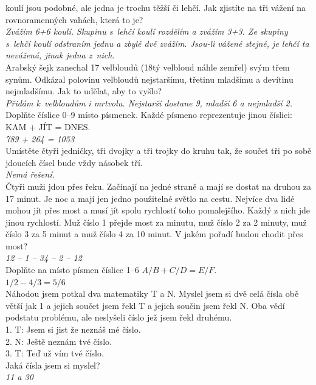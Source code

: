 \begin{multicols}{2}
 koulí jsou podobné, ale jedna je trochu těžší či lehčí. 
Jak zjistíte na tři vážení na rovnoramenných vahách, která to
je?\\[1 mm]
{\sl Zvážím 6+6 koulí. Skupinu s~lehčí koulí rozdělím a 
zvážím 3+3. Ze skupiny s~lehčí koulí odstraním jednu a 
zbylé dvě zvážím. Jsou-li vážené stejné, je lehčí ta nevážená, 
jinak jedna z~nich.}\\

\noindent
Arabský šejk zanechal 17 velbloudů (18tý velbloud náhle zemřel) 
svým třem synům. Odkázal polovinu velbloudů nejstaršímu, třetinu 
mladšímu a devítinu nejmladšímu. Jak to udělat, aby to vyšlo?\\[1 mm]
{\sl Přidám k~velbloudům i mrtvolu. Nejstarší dostane 9, 
mladší 6 a nejmladší 2.}\\

\noindent
Doplňte číslice 0--9 místo písmenek. Každé písmeno reprezentuje 
jinou číslici: KAM + JÍT = DNES.\\[1 mm]
{\sl 789 + 264 = 1053}\\

\noindent
Umístěte čtyři jedničky, tři dvojky a tři trojky do kruhu 
tak, že součet tři po sobě jdoucích čísel bude vždy násobek
tří.\\[1 mm]
{\sl Nemá řešení.}\\

\noindent
Čtyři muži jdou přes řeku. Začínají na jedné straně a mají 
se dostat na druhou za 17 minut. Je noc a mají jen jedno použitelné 
světlo na cestu. Nejvíce dva lidé mohou jít přes most a musí 
jít spolu rychlostí toho pomalejšího. Každý z nich jde jinou 
rychlostí. Muž číslo 1 přejde most za minutu, muž číslo 2 za 
2 minuty, muž číslo 3 za 5 minut a muž číslo 4 za 10 minut. V 
jakém pořadí budou chodit přes most?\\[1 mm]
{\sl 12 -- 1 -- 34 -- 2 -- 12}\\

\noindent
Doplňte na místo písmen číslice 1--6 $A/B+C/D=E/F$.\\[1 mm]
{\sl $1/2 - 4/3 = 5/6$}\\

\noindent
Náhodou jsem potkal dva matematiky T a N. Myslel jsem si 
dvě celá čísla obě větší jak 1 a jejich součet jsem řekl T a 
jejich součin jsem řekl N. Oba vědí podstatu problému, ale neslyšeli 
číslo jež jsem řekl druhému.\\
1. T: Jsem si jist že neznáš mé číslo.\\
2. N: Ještě neznám tvé číslo.\\
3. T: Teď už vím tvé číslo.\\
Jaká čísla jsem si myslel?\\[1 mm]
{\sl 11 a 30}\\


\end{multicols}
